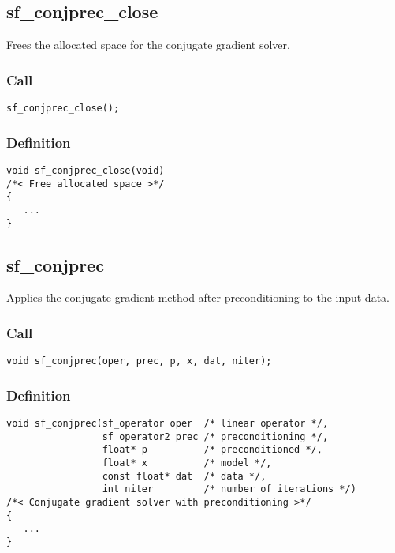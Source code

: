 \subsection{{sf\_conjprec\_close}}
Frees the allocated space for the conjugate gradient solver.

\subsubsection*{Call}
\begin{verbatim}sf_conjprec_close();\end{verbatim}

\subsubsection*{Definition}
\begin{verbatim}
void sf_conjprec_close(void)
/*< Free allocated space >*/
{
   ...
}
\end{verbatim}




\subsection{{sf\_conjprec}}
Applies the conjugate gradient method after preconditioning to the input data.

\subsubsection*{Call}
\begin{verbatim}
void sf_conjprec(oper, prec, p, x, dat, niter);\end{verbatim}

\subsubsection*{Definition}
\begin{verbatim}
void sf_conjprec(sf_operator oper  /* linear operator */, 
                 sf_operator2 prec /* preconditioning */, 
                 float* p          /* preconditioned */, 
                 float* x          /* model */, 
                 const float* dat  /* data */, 
                 int niter         /* number of iterations */)
/*< Conjugate gradient solver with preconditioning >*/
{
   ...
}
\end{verbatim}

